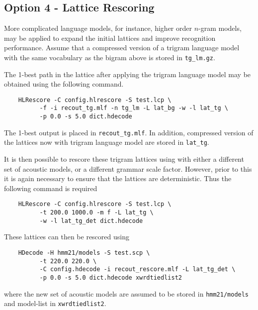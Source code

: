 \subsection{Option 4 - Lattice Rescoring}

More complicated language models, for instance, higher order $n$-gram
models, may be applied to expand the initial lattices and
improve recognition performance. Assume that a compressed version of a
trigram language model with the same vocabulary as the bigram above is stored
in \texttt{tg\_lm.gz}. 

The 1-best path in the lattice after applying the trigram language
model may be obtained using the following command.
\begin{verbatim}
    HLRescore -C config.hlrescore -S test.lcp \
          -f -i recout_tg.mlf -n tg_lm -L lat_bg -w -l lat_tg \
          -p 0.0 -s 5.0 dict.hdecode
\end{verbatim}
The 1-best output is placed in \texttt{recout\_tg.mlf}. In addition,
compressed version of the lattices now with trigram language model are stored
in \texttt{lat\_tg}. 


It is then possible to rescore these trigram lattices using 
with either a different set of acoustic models, or a different grammar scale
factor. However, prior to this it is again necessary to ensure that
the lattices are deterministic. Thus the following command is required
\begin{verbatim}
    HLRescore -C config.hlrescore -S test.lcp \
          -t 200.0 1000.0 -m f -L lat_tg \
          -w -l lat_tg_det dict.hdecode 
\end{verbatim}
These lattices can then be rescored using 
\begin{verbatim}
    HDecode -H hmm21/models -S test.scp \
          -t 220.0 220.0 \
          -C config.hdecode -i recout_rescore.mlf -L lat_tg_det \
          -p 0.0 -s 5.0 dict.hdecode xwrdtiedlist2
\end{verbatim}
where the new set of acoustic models are assumed to be stored in
\texttt{hmm21/models} and  model-list in \texttt{xwrdtiedlist2}.


